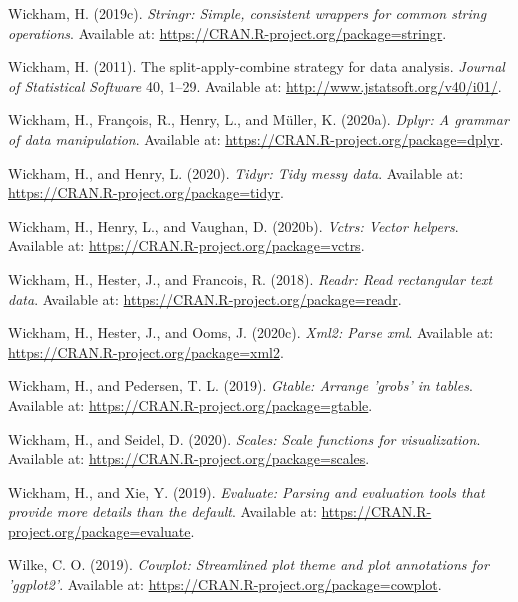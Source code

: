 \documentclass[utf8]{frontiersSCNS}
\begin{document}
\leavevmode\hypertarget{ref-wickham2019stringr}{}%
Wickham, H. (2019c). \emph{Stringr: Simple, consistent wrappers for
common string operations}. Available at:
\url{https://CRAN.R-project.org/package=stringr}.

\leavevmode\hypertarget{ref-wickham2011split}{}%
Wickham, H. (2011). The split-apply-combine strategy for data analysis.
\emph{Journal of Statistical Software} 40, 1--29. Available at:
\url{http://www.jstatsoft.org/v40/i01/}.

\leavevmode\hypertarget{ref-wickham2020dplyr}{}%
Wickham, H., François, R., Henry, L., and Müller, K. (2020a).
\emph{Dplyr: A grammar of data manipulation}. Available at:
\url{https://CRAN.R-project.org/package=dplyr}.

\leavevmode\hypertarget{ref-wickham2020tidyr}{}%
Wickham, H., and Henry, L. (2020). \emph{Tidyr: Tidy messy data}.
Available at: \url{https://CRAN.R-project.org/package=tidyr}.

\leavevmode\hypertarget{ref-wickham2020vctrs}{}%
Wickham, H., Henry, L., and Vaughan, D. (2020b). \emph{Vctrs: Vector
helpers}. Available at: \url{https://CRAN.R-project.org/package=vctrs}.

\leavevmode\hypertarget{ref-wickham2018readr}{}%
Wickham, H., Hester, J., and Francois, R. (2018). \emph{Readr: Read
rectangular text data}. Available at:
\url{https://CRAN.R-project.org/package=readr}.

\leavevmode\hypertarget{ref-wickham2020xml2}{}%
Wickham, H., Hester, J., and Ooms, J. (2020c). \emph{Xml2: Parse xml}.
Available at: \url{https://CRAN.R-project.org/package=xml2}.

\leavevmode\hypertarget{ref-wickham2019gtable}{}%
Wickham, H., and Pedersen, T. L. (2019). \emph{Gtable: Arrange 'grobs'
in tables}. Available at:
\url{https://CRAN.R-project.org/package=gtable}.

\leavevmode\hypertarget{ref-wickham2020scales}{}%
Wickham, H., and Seidel, D. (2020). \emph{Scales: Scale functions for
visualization}. Available at:
\url{https://CRAN.R-project.org/package=scales}.

\leavevmode\hypertarget{ref-wickham2019evaluate}{}%
Wickham, H., and Xie, Y. (2019). \emph{Evaluate: Parsing and evaluation
tools that provide more details than the default}. Available at:
\url{https://CRAN.R-project.org/package=evaluate}.

\leavevmode\hypertarget{ref-wilke2019cowplot}{}%
Wilke, C. O. (2019). \emph{Cowplot: Streamlined plot theme and plot
annotations for 'ggplot2'}. Available at:
\url{https://CRAN.R-project.org/package=cowplot}.
\end{document}
